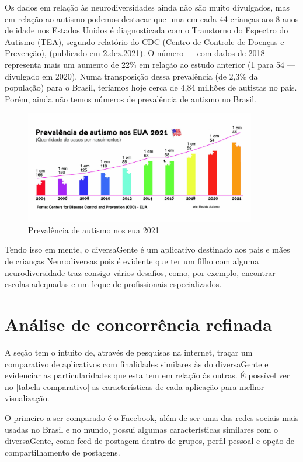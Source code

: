 Os dados em relação às neurodiversidades ainda não são muito divulgados, mas em relação ao autismo podemos destacar que uma em cada 44 crianças aos 8 anos de idade nos Estados Unidos é diagnosticada com o Transtorno do Espectro do Autismo (TEA), segundo relatório do CDC (Centro de Controle de Doenças e Prevenção), (publicado em 2.dez.2021). O número — com dados de 2018 — representa mais um aumento de 22\% em relação ao estudo anterior (1 para 54 — divulgado em 2020). Numa transposição dessa prevalência (de 2,3\% da população) para o Brasil, teríamos hoje cerca de 4,84 milhões de autistas no país. Porém, ainda não temos números de prevalência de autismo no Brasil.

\begin{figure}[htb]
	
	\centering
	\caption{\label{fig_arq_virado}Prevalência de autismo nos \ac{eua} 2021}
	\includegraphics[width=0.9\textwidth]{anexos/diversaGenteGrafico.png}
\end{figure}

Tendo isso em mente, o diversaGente é um aplicativo destinado aos pais e mães de crianças Neurodiversas  pois é evidente que ter um filho com alguma neurodiversidade traz consigo vários desafios, como, por exemplo, encontrar escolas adequadas e um leque de profissionais especializados.

\section{Análise de concorrência refinada}

A seção tem o intuito de, através de pesquisas na internet, traçar um comparativo de aplicativos com finalidades similares às do diversaGente e evidenciar as particularidades que esta tem em relação às outras. É possível ver no \autoref{tabela-comparativo} as características de cada aplicação para melhor visualização. 

O primeiro a ser comparado é o Facebook, além de ser uma das redes sociais mais usadas no Brasil e no mundo, possui algumas características similares com o diversaGente, como feed de postagem dentro de grupos, perfil pessoal e opção de compartilhamento de postagens. 

